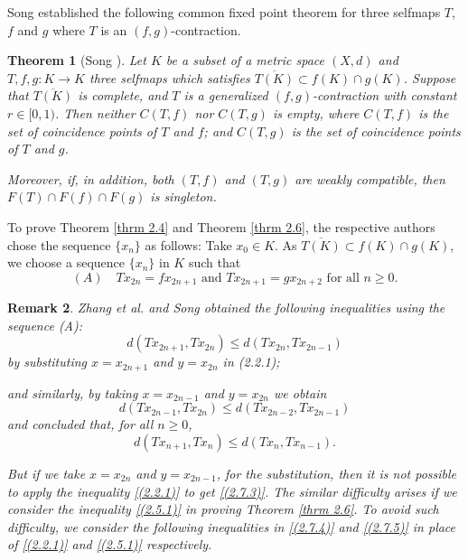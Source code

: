 \documentclass[a4paper,12pt,oneside]{article}
\newtheorem{theorem}{Theorem}[section]
\newtheorem{remark}[theorem]{Remark}
\numberwithin{equation}{section}
\begin{document}
Song \cite{Song2007} established the following common fixed point theorem for three selfmaps $T$, $f$ and $g$ where $T$ is an $(f,g)$-contraction.

\begin{theorem}[Song \cite{Song2007}] \label{thrm 2.6}
Let $K$ be a subset of a metric space $(X,d)$ and $T, f, g:K \to K$ three selfmaps which satisfies $\overline{T(K)} \subset f(K) \cap g(K)$. Suppose that $\overline{T(K)}$ is complete, and $T$ is a generalized $(f,g)$-contraction with constant $r \in [0,1)$. Then neither $C(T,f)$ nor $C(T,g)$ is empty, where $C(T,f)$ is the set of coincidence points of $T$ and $f$; and $C(T,g)$ is the set of coincidence points of $T$ and $g$.

Moreover, if, in addition, both $(T,f)$ and $(T,g)$ are weakly compatible, then $F(T) \cap F(f) \cap F(g)$ is singleton.
\end{theorem}

To prove Theorem \eqref{thrm 2.4} and Theorem \eqref{thrm 2.6}, the respective authors chose the sequence $\{x_n\}$ as follows: Take $x_0 \in K$. As $\overline{T(K)} \subset f(K) \cap g(K)$, we choose a sequence $\{x_n\}$ in $K$ such that
\begin{equation}
(A) \quad Tx_{2n} = fx_{2n+1} \text{ and } Tx_{2n+1} = gx_{2n+2} \text{ for all } n \geq 0.
\end{equation}

\begin{remark}
Zhang \emph{et al.} \cite{Zhang2008} and Song \cite{Song2007} obtained the following inequalities using the sequence (A):
\begin{equation} \label{(2.7.1)}
  d(Tx_{2n+1},Tx_{2n}) \leq d(Tx_{2n},Tx_{2n-1})
\end{equation}
by substituting $x=x_{2n+1}$ and $y=x_{2n}$ in (2.2.1);

and similarly, by taking $x=x_{2n-1}$ and $y=x_{2n}$ we obtain
\begin{equation} \label{(2.7.2)}
  d(Tx_{2n-1},Tx_{2n}) \leq d(Tx_{2n-2},Tx_{2n-1})
\end{equation}
and concluded that, for all $n \geq 0$,
\begin{equation} \label{(2.7.3)}
  d(Tx_{n+1},Tx_n) \leq d(Tx_n,Tx_{n-1}).
\end{equation}

But if we take $x=x_{2n}$ and $y=x_{2n-1}$, for the substitution, then it is not possible to apply the inequality \eqref{(2.2.1)} to get \eqref{(2.7.3)}. The similar difficulty arises if we consider the inequality \eqref{(2.5.1)} in proving Theorem \eqref{thrm 2.6}. To avoid such difficulty, we consider the following inequalities in \eqref{(2.7.4)} and \eqref{(2.7.5)} in place of \eqref{(2.2.1)} and \eqref{(2.5.1)} respectively.
\end{remark}
\end{document}
